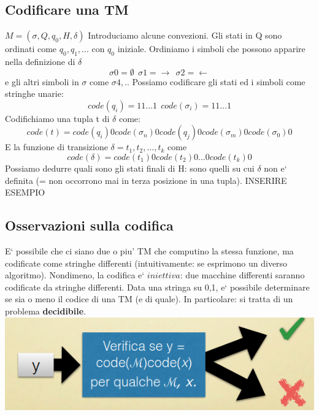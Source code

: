 \documentclass[a4paper, 12pt]{article}
\begin{document}
\subsection{Codificare una TM}
\(M = (\sigma, Q, q_0, H, \delta)\)
Introduciamo alcune convezioni. Gli stati in Q sono ordinati come \(q_0,q_1,...\) con \(q_0\) iniziale. Ordiniamo i simboli che possono apparire nella definizione di \(\delta\)
\[\sigma0 = \emptyset \   \ \sigma1 = \rightarrow \    \ \sigma2=\leftarrow \]
e gli altri simboli in \(\sigma\) come \(\sigma4,..\)
Possiamo codificare gli stati ed i simboli come stringhe unarie: \[code(q_i) = 11...1 \   \ code(\sigma_i)=11...1\]
Codifichiamo una tupla t di $\delta$ come: \[code(t) =code(q_i)0code(\sigma_n)0code(q_j)0code(\sigma_m)0code(\sigma_0)0\]
E la funzione di transizione $\delta={t_1,t_2,...,t_k}$ come \[code(\delta) = code(t_1)0code(t_2)0...0code(t_k)0\]
Possiamo dedurre quali sono gli stati finali di H: sono quelli su cui $\delta$ non e` definita (= non occorrono mai in terza posizione in una tupla).
INSERIRE ESEMPIO
\subsection{Osservazioni sulla codifica}
E` possibile che ci siano due o piu' TM che computino la stessa funzione, ma codificate come stringhe differenti (intuitivamente: se esprimono un diverso algoritmo). Nondimeno, la codifica e` \(iniettiva\): due macchine differenti saranno codificate da stringhe differenti. Data una stringa su {0,1}, e` possibile determinare se sia o meno il codice di una TM (e di quale). In particolare: si tratta di un problema \textbf{decidibile}.\\
\includegraphics[scale=0.6]{codifica_UTM.png}
\end{document}
